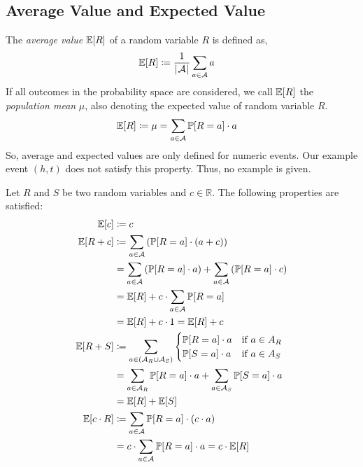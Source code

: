 \subsection{Average Value and Expected Value}
\label{sec:bp-ae}
%
The \emph{average value} $\mathbb E[R]$ of a random variable $R$ is defined as,
\begin{align}
  \mathbb E[R] &\coloneqq \frac{1}{\left|\hskip .06667em \mathcal A\hskip .06667em \right|} \sum_{a \in \mathcal A} a
\end{align}
If all outcomes in the probability space are considered, we call $\mathbb E[R]$ the \emph{population mean} $\mu$,
also denoting the expected value of random variable $R$.
\begin{align}
  \mathbb E[R] &\coloneqq \mu = \sum_{a \in \mathcal A} \mathbb P[R=a] \cdot a
\end{align}
So, average and expected values are only defined for numeric events.
Our example event $(h,t)$ does not satisfy this property.
Thus, no example is given.

Let $R$ and $S$ be two random variables and $c \in \mathbb R$.
The following properties are satisfied:
\begin{align}
  \mathbb E[c]     &\coloneqq c \\
  \mathbb E[R + c] &\coloneqq \sum_{a \in \mathcal A} \left(\mathbb P[R=a] \cdot (a + c)\right) \notag\\
            &= \sum_{a \in \mathcal A} \left(\mathbb P[R=a] \cdot a\right) + \sum_{a \in \mathcal A} \left(\mathbb P[R=a] \cdot c\right) \notag\\
            &= \mathbb E[R] + c \cdot \sum_{a \in \mathcal A} \mathbb P[R=a] \notag\\
            &= \mathbb E[R] + c \cdot 1 = \mathbb E[R] + c \\
  \mathbb E[R + S] &\coloneqq \sum_{a \in (\mathcal A_R \cup \mathcal A_S)}
              \begin{cases}
                \mathbb P[R=a] \cdot a & \text{if } a \in A_R \\
                \mathbb P[S=a] \cdot a & \text{if } a \in A_S
              \end{cases}\notag\\
            &= \sum_{a \in \mathcal A_R} \mathbb P[R=a] \cdot a + \sum_{a \in \mathcal A_S} \mathbb P[S=a] \cdot a \notag\\
            &= \mathbb E[R] + \mathbb E[S] \\
  \mathbb E[c \cdot R] &\coloneqq \sum_{a \in \mathcal A} \mathbb P[R=a] \cdot (c \cdot a) \notag\\
            &= c \cdot \sum_{a \in \mathcal A} \mathbb P[R=a] \cdot a = c \cdot \mathbb E[R]
\end{align}

